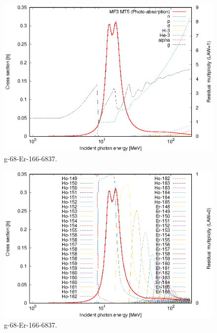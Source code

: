 \begin{figure}
 \includegraphics[width=\linewidth]{eps/g_68-Er-166_6837.eps}
  \caption{g-68-Er-166-6837.}
\end{figure}
\begin{figure}
 \includegraphics[width=\linewidth]{eps-law0/g_68-Er-166_6837.eps}
 \caption{g-68-Er-166-6837.}
\end{figure}
\newpage \clearpage

